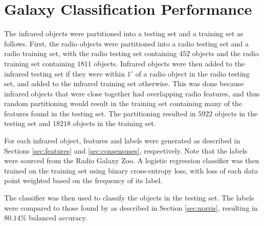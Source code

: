 \section{Galaxy Classification Performance}
\label{sec:rgz-results}


  The infrared objects were partitioned into a testing set and a training set
  as follows. First, the radio objects were partitioned into a radio testing
  set and a radio training set, with the radio testing set containing $452$
  objects and the radio training set containing $1811$ objects. Infrared
  objects were then added to the infrared testing set if they were within $1'$
  of a radio object in the radio testing set, and added to the infrared
  training set otherwise. This was done because infrared objects that were
  close together had overlapping radio features, and thus random partitioning
  would result in the training set containing many of the features found in
  the testing set. The partitioning resulted in $5922$ objects in the testing
  set and $18218$ objects in the training set.

  For each infrared object, features and labels were generated as described in
  Sections \ref{sec:features} and \ref{sec:consensuses}, respectively. Note
  that the labels were sourced from the Radio Galaxy Zoo. A logistic
  regression classifier was then trained on the training set using binary
  cross-entropy loss, with loss of each data point weighted based on the
  frequency of its label.

  The classifier was then used to classify the objects in the testing set. The
  labels were compared to those found by \citet{norris06} as described in
  Section \ref{sec:norris}, resulting in $80.14\%$ balanced accuracy.



